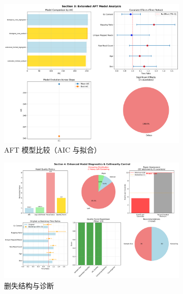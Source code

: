 \documentclass[withoutpreface]{cumcmthesis}
\begin{document}
\begin{figure}[htbp]
\centering
\begin{subfigure}{0.48\textwidth}
  \centering
  \includegraphics[width=\linewidth]{output/figures/p3_section3_aft_model_analysis.png}
  \caption{AFT 模型比较（AIC 与拟合）}
\end{subfigure}\hfill
\begin{subfigure}{0.48\textwidth}
  \centering
  \includegraphics[width=\linewidth]{output/figures/p3_section4_model_diagnostics.png}
  \caption{删失结构与诊断}
\end{subfigure}\\[4pt]
\begin{subfigure}{0.48\textwidth}
  \centering

\end{subfigure}
\end{figure}
\end{document}
